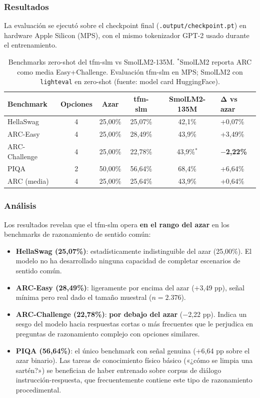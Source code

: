 \subsubsection*{Resultados}

La evaluación se ejecutó sobre el checkpoint final (\texttt{.output/checkpoint.pt}) en hardware Apple Silicon (MPS), con el mismo tokenizador GPT-2 usado durante el entrenamiento.

\begin{table}[H]
\centering
\begin{tabularx}{\textwidth}{|l|c|c|c|c|X|}
\hline
\textbf{Benchmark} & \textbf{Opciones} & \textbf{Azar} & \textbf{tfm-slm} & \textbf{SmolLM2-135M} & \textbf{Δ vs azar} \\ \hline
HellaSwag & 4 & 25,00\% & 25,07\% & 42,1\% & +0,07\% \\ \hline
ARC-Easy & 4 & 25,00\% & 28,49\% & 43,9\% & +3,49\% \\ \hline
ARC-Challenge & 4 & 25,00\% & 22,78\% & 43,9\%$^*$ & \textbf{$-$2,22\%} \\ \hline
PIQA & 2 & 50,00\% & 56,64\% & 68,4\% & +6,64\% \\ \hline
ARC (media) & 4 & 25,00\% & 25,64\% & 43,9\% & +0,64\% \\ \hline
\end{tabularx}
\caption{Benchmarks zero-shot del tfm-slm vs SmolLM2-135M. $^*$SmolLM2 reporta ARC como media Easy+Challenge. Evaluación tfm-slm en MPS; SmolLM2 con \texttt{lighteval} en zero-shot (fuente: model card HuggingFace).}
\label{tab:lmeval}
\end{table}

\subsubsection*{Análisis}

Los resultados revelan que el tfm-slm opera \textbf{en el rango del azar} en los benchmarks de razonamiento de sentido común:

\begin{itemize}
    \item \textbf{HellaSwag (25,07\%)}: estadísticamente indistinguible del azar (25,00\%). El modelo no ha desarrollado ninguna capacidad de completar escenarios de sentido común.
    \item \textbf{ARC-Easy (28,49\%)}: ligeramente por encima del azar ($+$3,49 pp), señal mínima pero real dado el tamaño muestral ($n = 2.376$).
    \item \textbf{ARC-Challenge (22,78\%)}: \textbf{por debajo del azar} ($-$2,22 pp). Indica un sesgo del modelo hacia respuestas cortas o más frecuentes que le perjudica en preguntas de razonamiento complejo con opciones similares.
    \item \textbf{PIQA (56,64\%)}: el único benchmark con señal genuina (+6,64 pp sobre el azar binario). Las tareas de conocimiento físico básico («¿cómo se limpia una sartén?») se benefician de haber entrenado sobre corpus de diálogo instrucción-respuesta, que frecuentemente contiene este tipo de razonamiento procedimental.
\end{itemize}

